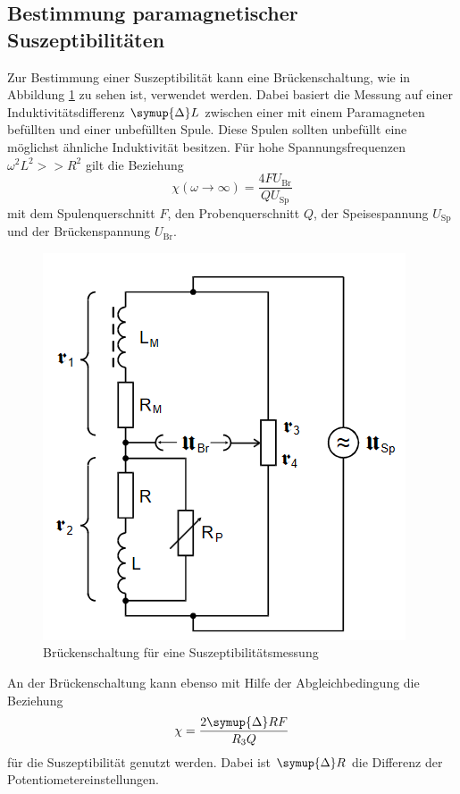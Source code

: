 \subsection{Bestimmung paramagnetischer Suszeptibilitäten}
Zur Bestimmung einer Suszeptibilität kann eine Brückenschaltung, wie in Abbildung \ref{fig:sus} zu sehen ist, verwendet werden. 
Dabei basiert die Messung auf einer Induktivitätsdifferenz $\symup{\Delta}L$ zwischen einer mit einem Paramagneten befüllten und einer unbefüllten Spule.
Diese Spulen sollten unbefüllt eine möglichst ähnliche Induktivität besitzen.
Für hohe Spannungsfrequenzen $\omega^2 L^2 >> R^2$ gilt die Beziehung
\begin{equation}
    \chi\left(\omega \to \infty \right) =\frac{4 F U_\text{Br}}{Q U_\text{Sp}}
    \label{eqn:chil}
\end{equation}
mit dem Spulenquerschnitt $F$, den Probenquerschnitt $Q$, der Speisespannung $U_\text{Sp}$ und der Brückenspannung $U_\text{Br}$.
\begin{figure}
    \centering
    \includegraphics[scale=0.4]{pics/sus.png}
    \caption{Brückenschaltung für eine Suszeptibilitätsmessung \cite{v606}}
    \label{fig:sus}
  \end{figure}
An der Brückenschaltung kann ebenso mit Hilfe der Abgleichbedingung die Beziehung
\begin{equation}
    \chi = \frac{2 \symup{\Delta}R F}{R_3 Q}
    \label{eqn:chir}
\end{equation}
für die Suszeptibilität genutzt werden. Dabei ist $\symup{\Delta}R$ die Differenz der Potentiometereinstellungen.